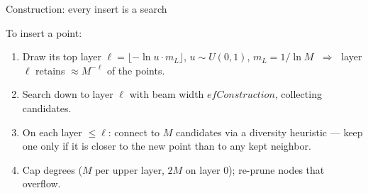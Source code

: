 \documentclass[aspectratio=169,12pt]{beamer}
\begin{document}
\begin{frame}{Construction: every insert is a search}

\footnotesize
To insert a point:
\begin{enumerate}\setlength\itemsep{1pt}
  \item Draw its top layer $\ell = \lfloor -\ln u \cdot m_L \rfloor$, $u\sim U(0,1)$,
    $m_L = 1/\ln M$ $\;\Rightarrow\;$ layer $\ell$ retains $\approx M^{-\ell}$ of the points.
  \item Search down to layer $\ell$ with beam width $\mathit{efConstruction}$, collecting candidates.
  \item On each layer $\leq \ell$: connect to $M$ candidates via a \textcolor{key}{diversity
    heuristic} --- keep one only if it is closer to the new point than to any kept neighbor.
  \item Cap degrees ($M$ per upper layer, $2M$ on layer 0); re-prune nodes that overflow.
\end{enumerate}

\vspace{1pt}

\vspace{1pt}
\end{frame}
\end{document}
